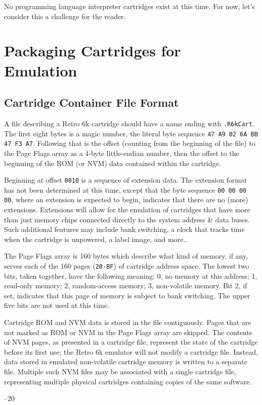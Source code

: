 \documentclass[12pt]{{memoir}}
\begin{document}
No programming language interpreter cartridges exist at this time. For now, let's consider this a challenge for the reader.

\chapter{Packaging Cartridges for Emulation}
\section{Cartridge Container File Format}

A file describing a Retro 6k cartridge should have a name ending with \texttt{.R6kCart}. The first eight bytes is a magic number, the literal byte sequence \texttt{47 A9 02 6A BB 47 F3 A7}. Following that is the offset (counting from the beginning of the file) to the Page Flags array as a 4-byte little-endian number, then the offset to the beginning of the ROM (or NVM) data contained within the cartridge.

Beginning at offset \texttt{0010} is a sequence of extension data. The extension format has not been determined at this time, except that the byte sequence \texttt{00 00 00 00}, where an extension is expected to begin, indicates that there are no (more) extensions. Extensions will allow for the emulation of cartridges that have more than just memory chips connected directly to the system address \& data buses. Such additional features may include bank switching, a clock that tracks time when the cartridge is unpowered, a label image, and more..

The Page Flags array is 160 bytes which describe what kind of memory, if any, serves each of the 160 pages (\texttt{20-BF}) of cartridge address space. The lowest two bits, taken together, have the following meaning: 0, no memory at this address; 1, read-only memory; 2, random-access memory; 3, non-volatile memory. Bit 2, if set, indicates that this page of memory is subject to bank switching. The upper five bits are not used at this time.

Cartridge ROM and NVM data is stored in the file contiguously. Pages that are not marked as ROM or NVM in the Page Flags array are skipped. The contents of NVM pages, as presented in a cartridge file, represent the state of the cartridge before its first use; the Retro 6k emulator will not modify a cartridge file. Instead, data stored in emulated non-volatile cartridge memory is written to a separate file. Multiple such NVM files may be associated with a single cartridge file, representing multiple physical cartridges containing copies of the same software.

\cleartoverso
\pagestyle{empty}

\noindent\thetitle\hfill{}--20 \theauthor
\end{document}
